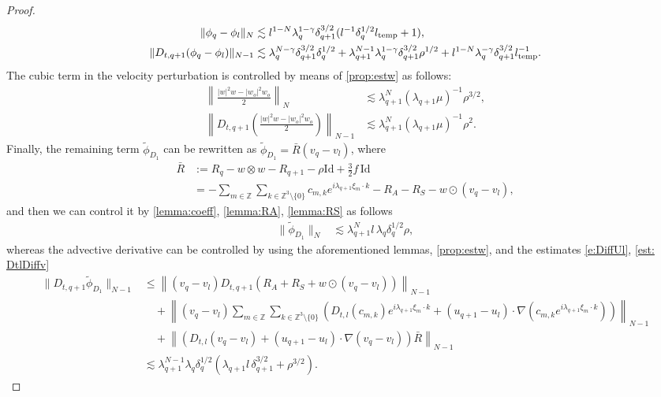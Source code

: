 \documentclass[10pt,a4paper]{amsart}
\numberwithin{equation}{section}
\numberwithin{corollario}{section}
\numberwithin{lemma}{section}
\numberwithin{prop}{section}
\theoremstyle{definition}
\theoremstyle{remark}
\newcommand{\Z}{\mathbb{Z}}
\newcommand{\Id}{\mathrm{Id}}
\newcommand{\qq}{_{q+1}}
\newcommand{\SymOt}{\odot}
\begin{document}
\begin{proof}
\begin{align}\label{est:phiD1third}
    \|\phi_q-\phi_l\|_N
    &\lesssim 
    l^{1-N}\lambda_q^{1-\gamma}\delta\qq^{3/2}(l^{-1}\delta_q^{1/2}l_{\rm temp}+1),\\
    \|D_{t,q+1}(\phi_q-\phi_l)\|_{N-1}
    &\lesssim 
    \lambda_q^{N-\gamma}\delta\qq^{3/2}\delta_q^{1/2}+ \lambda\qq^{N-1}\lambda_q^{1-\gamma}\delta\qq^{3/2} \rho^{1/2}+l^{1-N}\lambda_q^{-\gamma}\delta\qq^{3/2} l_{\rm temp}^{-1}.
\end{align}
The cubic term in the velocity perturbation is controlled by means of \autoref{prop:estw} as follows:
\begin{align}\label{est:phiD1fourth}
    \left\|\frac{|w|^2w-|w_o|^2w_o}{2}\right\|_N
    &\lesssim 
    \lambda\qq^N(\lambda\qq\mu)^{-1}\rho^{3/2},\\
    \left\|D_{t,q+1}\left(\frac{|w|^2w-|w_o|^2w_o}{2}\right)\right\|_{N-1}
    &\lesssim 
    \lambda\qq^N(\lambda\qq\mu)^{-1}\rho^2.
\end{align}
Finally, the remaining term $\tilde{\phi}_{D_1}$ can be rewritten as $\tilde{\phi}_{D_1} = \bar{R}(v_q-v_l)$, where 
\begin{align}
    \bar{R}
    &:=
     R_q-w\otimes w-R\qq-\rho\Id+\frac32f\,\Id 
    \\
    &=
    -\sum_{m\in\Z}\sum_{k \in \Z^3 \setminus \{0\}}c_{m,k}e^{i\lambda\qq\xi_m \cdot k}-R_A-R_S-w\SymOt(v_q-v_l),
\end{align}
and then we can control it by \autoref{lemma:coeff}, \autoref{lemma:RA}, \autoref{lemma:RS} as follows
\begin{align}
    \|\tilde{\phi}_{D_1}\|_N
    &\lesssim \lambda\qq^Nl\,\lambda_q\delta_q^{1/2}\rho,
\end{align}
whereas the advective derivative can be controlled by using the aforementioned lemmas, \autoref{prop:estw}, and the estimates \eqref{e:DiffUl}, \eqref{est: DtlDiffv}
\begin{align}
    \|D_{t,q+1}\tilde{\phi}_{D_1}\|_{N-1}
    &\le
    \left\|(v_q-v_l)D_{t,q+1}(R_A+R_S+w\SymOt(v_q-v_l))\right\|_{N-1}
    \\
    &\quad+
    \left\|(v_q-v_l)\sum_{m\in\Z}\sum_{k \in \Z^3 \setminus \{0\}} \left( D_{t,l}(c_{m,k})e^{i\lambda\qq\xi_m \cdot k}+(u\qq-u_l)\cdot \nabla (c_{m,k}e^{i\lambda\qq\xi_m \cdot k}) \right) \right\|_{N-1}
    \\
        &\quad+
        \left\|\left( D_{t,l}(v_q-v_l)+(u\qq-u_l)\cdot \nabla(v_q-v_l) \right) \bar{R}\right\|_{N-1}
        \\&\lesssim\lambda\qq^{N-1}\lambda_q\delta_q^{1/2}\left(\lambda\qq l\,\delta\qq^{3/2}+\rho^{3/2}\right).
\end{align}
\end{proof}
\end{document}
